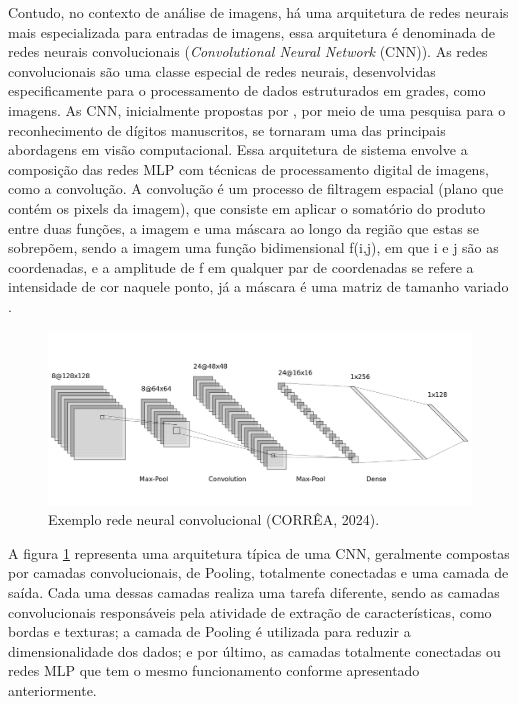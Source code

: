 Contudo, no contexto de análise de imagens, há uma arquitetura de redes neurais mais especializada para entradas de imagens, essa arquitetura é denominada de redes neurais convolucionais (\textit{Convolutional Neural Network} (CNN)). As redes convolucionais são uma classe especial de redes neurais, desenvolvidas especificamente para o processamento de dados estruturados em grades, como imagens. As CNN, inicialmente propostas por , por meio de uma pesquisa para o reconhecimento de dígitos manuscritos, se tornaram uma das principais abordagens em visão computacional. Essa arquitetura de sistema envolve a composição das redes MLP com técnicas de processamento digital de imagens, como a convolução. A convolução é um processo de filtragem espacial (plano que contém os pixels da imagem), que consiste em aplicar o somatório do produto entre duas funções, a imagem e uma máscara ao longo da região que estas se sobrepõem, sendo a imagem uma função bidimensional f(i,j), em que i e j são as coordenadas, e a amplitude de f em qualquer par de coordenadas se refere a intensidade de cor naquele ponto, já a máscara é uma matriz de tamanho variado \cite{gonzalez2008digital}. 

\begin{figure}[h]
    \centering
    \includegraphics[scale=0.4]{images/redeconv.png}
    \caption{Exemplo rede neural convolucional (CORRÊA, 2024).}
    \label{fig: cnn}
\end{figure}

A figura \ref{fig: cnn} representa uma arquitetura típica de uma CNN, geralmente compostas por camadas convolucionais, de Pooling, totalmente conectadas e uma camada de saída. Cada uma dessas camadas realiza uma tarefa diferente, sendo as camadas convolucionais responsáveis pela atividade de extração de características, como bordas e texturas; a camada de Pooling é utilizada para reduzir a dimensionalidade dos dados; e por último, as camadas totalmente conectadas ou redes MLP que tem o mesmo funcionamento conforme apresentado anteriormente. 

